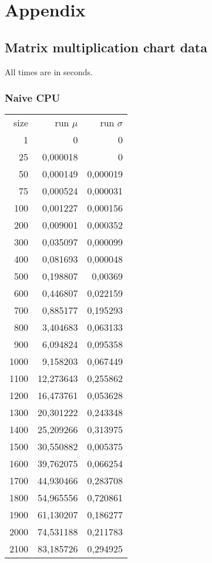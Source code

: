 \section{Appendix}

\subsection{Matrix multiplication chart data}
\label{sec:matrix_mul_chart_data}

All times are in seconds.

\subsubsection{Naive CPU}

\begin{tabular}{r r r}
size & run $\mu$ & run $\sigma$ \\
1 & 0 & 0 \\
25 & 0,000018 & 0 \\
50 & 0,000149 & 0,000019 \\
75 & 0,000524 & 0,000031 \\
100 & 0,001227 & 0,000156 \\
200 & 0,009001 & 0,000352 \\
300 & 0,035097 & 0,000099 \\
400 & 0,081693 & 0,000048 \\
500 & 0,198807 & 0,00369 \\
600 & 0,446807 & 0,022159 \\
700 & 0,885177 & 0,195293 \\
800 & 3,404683 & 0,063133 \\
900 & 6,094824 & 0,095358 \\
1000 & 9,158203 & 0,067449 \\
1100 & 12,273643 & 0,255862 \\
1200 & 16,473761 & 0,053628 \\
1300 & 20,301222 & 0,243348 \\
1400 & 25,209266 & 0,313975 \\
1500 & 30,550882 & 0,005375 \\
1600 & 39,762075 & 0,066254 \\
1700 & 44,930466 & 0,283708 \\
1800 & 54,965556 & 0,720861 \\
1900 & 61,130207 & 0,186277 \\
2000 & 74,531188 & 0,211783 \\
2100 & 83,185726 & 0,294925 \\

\end{tabular}
